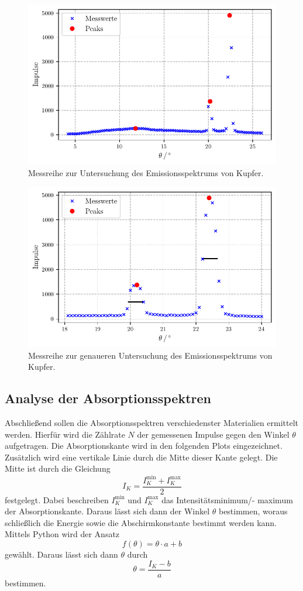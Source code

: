 \begin{figure}
  \centering
  \caption{Messreihe zur Untersuchung des Emissionsspektrums von Kupfer.}
  \label{fig:kupfer1}
  \includegraphics[width=0.5 \linewidth]{build/kupfer1.pdf}
\end{figure}

\begin{figure}
  \centering
  \caption{ Messreihe zur genaueren Untersuchung des Emissionsspektrums von Kupfer.}
  \label{fig:kupfer2}
  \includegraphics[width=0.5 \linewidth]{build/kupfer2.pdf}
\end{figure}

\subsection{Analyse der Absorptionsspektren}

Abschließend sollen die Absorptionsspektren verschiedenster Materialien ermittelt werden.
Hierfür wird die Zählrate $N$ der gemessenen Impulse gegen den Winkel $\theta$ aufgetragen.
Die Absorptionskante wird in den folgenden Plots eingezeichnet.
Zusätzlich wird eine vertikale Linie durch die Mitte dieser Kante gelegt.
Die Mitte ist durch die Gleichung
\begin{equation*}
  I_K = \frac{I_K^\text{min} + I_K^\text{max}}{2}
\end{equation*}
festgelegt. Dabei beschreiben $I_K^\text{min}$ und $I_K^\text{max}$ das Intensitätsminimum/- maximum der Absorptionskante.
Daraus lässt sich dann der Winkel $\theta$ bestimmen, woraus schließlich die Energie sowie die Abschirmkonstante bestimmt werden kann.
Mittels Python wird der Ansatz
\begin{equation}
  f(\theta) = \theta \cdot a + b
\end{equation}
gewählt.
Daraus lässt sich dann $\theta$ durch
\begin{equation}
  \theta = \frac{I_K - b}{a}
\end{equation}
bestimmen.
